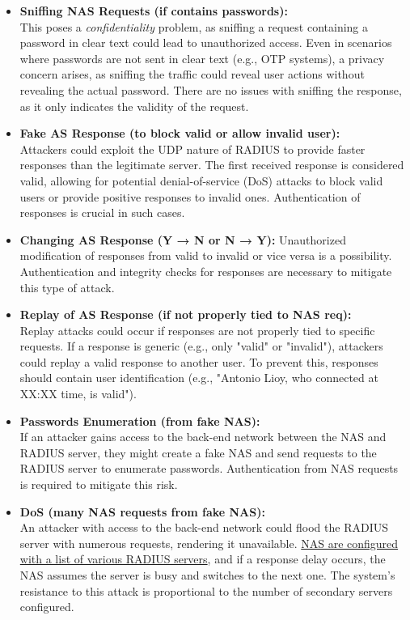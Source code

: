 \begin{itemize}
    \item \textbf{Sniffing NAS Requests (if contains passwords):}\\
          This poses a \textit{confidentiality} problem, as sniffing a request containing a password in clear text could lead to unauthorized access. Even in scenarios where passwords are not sent in clear text (e.g., OTP systems), a privacy concern arises, as sniffing the traffic could reveal user actions without revealing the actual password. There are no issues with sniffing the response, as it only indicates the validity of the request.

    \item \textbf{Fake AS Response (to block valid or allow invalid user):}\\
          Attackers could exploit the UDP nature of RADIUS to provide faster responses than the legitimate server. The first received response is considered valid, allowing for potential denial-of-service (DoS) attacks to block valid users or provide positive responses to invalid ones. Authentication of responses is crucial in such cases.

    \item \textbf{Changing AS Response (Y → N or N → Y):} Unauthorized modification of responses from valid to invalid or vice versa is a possibility. Authentication and integrity checks for responses are necessary to mitigate this type of attack.

    \item \textbf{Replay of AS Response (if not properly tied to NAS req):}\\
          Replay attacks could occur if responses are not properly tied to specific requests. If a response is generic (e.g., only "valid" or "invalid"), attackers could replay a valid response to another user. To prevent this, responses should contain user identification (e.g., "Antonio Lioy, who connected at XX:XX time, is valid").

    \item \textbf{Passwords Enumeration (from fake NAS):}\\
          If an attacker gains access to the back-end network between the NAS and RADIUS server, they might create a fake NAS and send requests to the RADIUS server to enumerate passwords. Authentication from NAS requests is required to mitigate this risk.

    \item \textbf{DoS (many NAS requests from fake NAS):} \\
    An attacker with access to the back-end network could flood the RADIUS server with numerous requests, rendering it unavailable. \ul{NAS are configured with a list of various RADIUS servers}, and if a response delay occurs, the NAS assumes the server is busy and switches to the next one. The system's resistance to this attack is proportional to the number of secondary servers configured.
\end{itemize}


